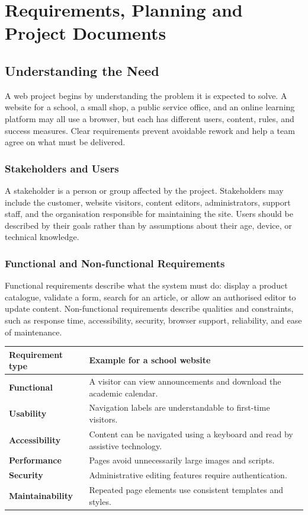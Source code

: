 \documentclass[11pt,openany,oneside]{book}
\begin{document}
\chapter{Requirements, Planning and Project Documents}
\section{Understanding the Need}
A web project begins by understanding the problem it is expected to solve. A website for a school, a small shop, a public service office, and an online learning platform may all use a browser, but each has different users, content, rules, and success measures. Clear requirements prevent avoidable rework and help a team agree on what must be delivered.

\subsection{Stakeholders and Users}
A stakeholder is a person or group affected by the project. Stakeholders may include the customer, website visitors, content editors, administrators, support staff, and the organisation responsible for maintaining the site. Users should be described by their goals rather than by assumptions about their age, device, or technical knowledge.

\subsection{Functional and Non-functional Requirements}
Functional requirements describe what the system must do: display a product catalogue, validate a form, search for an article, or allow an authorised editor to update content. Non-functional requirements describe qualities and constraints, such as response time, accessibility, security, browser support, reliability, and ease of maintenance.

\begin{center}
\begin{tabularx}{\textwidth}{>{\bfseries}p{}X}
\toprule
Requirement type & Example for a school website\\
\midrule
Functional & A visitor can view announcements and download the academic calendar.\\
Usability & Navigation labels are understandable to first-time visitors.\\
Accessibility & Content can be navigated using a keyboard and read by assistive technology.\\
Performance & Pages avoid unnecessarily large images and scripts.\\
Security & Administrative editing features require authentication.\\
Maintainability & Repeated page elements use consistent templates and styles.\\
\bottomrule
\end{tabularx}
\end{center}
\end{document}
